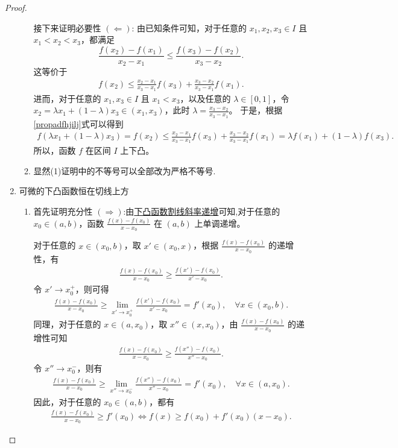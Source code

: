 \documentclass[lang=cn,newtx,10pt,scheme=chinese]{elegantbook}
\begin{document}
\begin{proof}
\begin{enumerate}
\begin{enumerate}[(1)]
接下来证明必要性 $(\Leftarrow)$:
由已知条件可知，对于任意的 $x_1, x_2, x_3 \in I$ 且 $x_1 < x_2 < x_3$，都满足
\[
\frac{f(x_2) - f(x_1)}{x_2 - x_1} \leqslant \frac{f(x_3) - f(x_2)}{x_3 - x_2}.
\]
这等价于
\begin{align}
f(x_2) \leqslant \frac{x_2 - x_1}{x_3 - x_1} f(x_3) + \frac{x_3 - x_2}{x_3 - x_1} f(x_1). \label{propadfhjilj}
\end{align}
进而，对于任意的 $x_1, x_3 \in I$ 且 $x_1 < x_3$，以及任意的 $\lambda \in [0, 1]$，令 $x_2 = \lambda x_1 + (1 - \lambda) x_3 \in (x_1, x_3)$，此时 $\lambda = \frac{x_3 - x_2}{x_3 - x_1}$。
于是，根据\eqref{propadfhjilj}式可以得到
\begin{align*}
f(\lambda x_1 + (1 - \lambda) x_3) = f(x_2) 
\leqslant \frac{x_2 - x_1}{x_3 - x_1} f(x_3) + \frac{x_3 - x_2}{x_3 - x_1} f(x_1) 
= \lambda f(x_1) + (1 - \lambda) f(x_3).
\end{align*}
所以，函数 $f$ 在区间 $I$ 上下凸。

\item 显然(1)证明中的不等号可以全部改为严格不等号.
\end{enumerate}

\item {\heiti 可微的下凸函数恒在切线上方}\begin{enumerate}[(1)]
\item 首先证明充分性 $(\Rightarrow)$:由\hyperref[下凸函数割线斜率递增]{下凸函数割线斜率递增}可知,对于任意的 $x_0\in (a,b)$，函数 $\frac{f(x) - f(x_0)}{x - x_0}$ 在 $(a,b)$ 上单调递增。

对于任意的 $x\in (x_0,b)$，取 $x'\in (x_0,x)$，根据 $\frac{f(x) - f(x_0)}{x - x_0}$ 的递增性，有
\begin{align*}
\frac{f(x) - f(x_0)}{x - x_0} \geqslant \frac{f(x') - f(x_0)}{x' - x_0}.
\end{align*}
令 $x'\to x_0^+$，则可得
\begin{align*}
\frac{f(x) - f(x_0)}{x - x_0} \geqslant \lim_{x'\to x_0^+}\frac{f(x') - f(x_0)}{x' - x_0}=f'(x_0),\quad \forall x\in (x_0,b).
\end{align*}
同理，对于任意的 $x\in (a,x_0)$，取 $x''\in (x,x_0)$，由 $\frac{f(x) - f(x_0)}{x - x_0}$ 的递增性可知
\begin{align*}
\frac{f(x) - f(x_0)}{x - x_0} \geqslant \frac{f(x'') - f(x_0)}{x'' - x_0}.
\end{align*}
令 $x''\to x_0^-$，则有
\begin{align*}
\frac{f(x) - f(x_0)}{x - x_0} \geqslant \lim_{x''\to x_0^-}\frac{f(x'') - f(x_0)}{x'' - x_0}=f'(x_0),\quad \forall x\in (a,x_0).
\end{align*}
因此，对于任意的 $x_0\in (a,b)$，都有
\begin{align*}
\frac{f(x) - f(x_0)}{x - x_0} \geqslant f'(x_0) \Leftrightarrow f(x)\geqslant f(x_0)+f'(x_0)(x - x_0).
\end{align*}


\end{enumerate}
\end{enumerate}
\end{proof}
\end{document}

